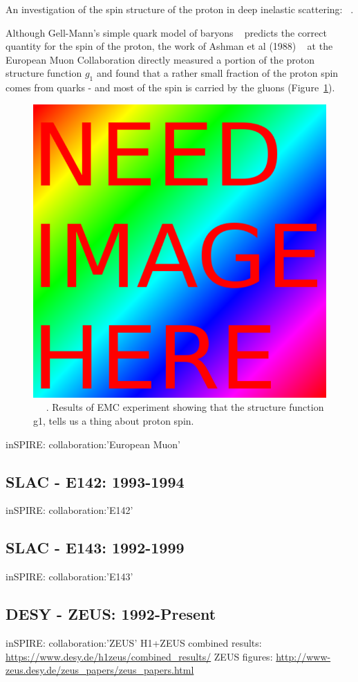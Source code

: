 An investigation of the spin structure of the proton in deep inelastic
scattering: ~\cite{Ashman1989}.

Although Gell-Mann's simple quark model of baryons ~\cite{Gell-Mann1961}
predicts the correct quantity for the spin of the proton, the work of Ashman et
al (1988) ~\needcite{} at the European Muon Collaboration directly measured a
portion of the proton structure function $g_1$ and found that a rather small
fraction of the proton spin comes from quarks - and most of the spin is carried
by the gluons (Figure~\ref{fig:emc_g1_result}).

\begin{figure}[ht]
	\begin{center}
	\includegraphics[width=0.5\linewidth]{../filler/squareimg.png}
	\caption{
		~\needfig{} ~\needcap{}. Results of EMC experiment showing that the structure
		function g1, tells us a thing about proton spin.
	}
	\label{fig:emc_g1_result}
\end{center}
\end{figure}

inSPIRE: collaboration:'European Muon'

\subsection{SLAC - E142: 1993-1994}
inSPIRE: collaboration:'E142'

\subsection{SLAC - E143: 1992-1999} 
inSPIRE: collaboration:'E143'

\subsection{DESY - ZEUS: 1992-Present}
inSPIRE: collaboration:'ZEUS'
H1+ZEUS combined results: \url{https://www.desy.de/h1zeus/combined_results/}
ZEUS figures: \url{http://www-zeus.desy.de/zeus_papers/zeus_papers.html}

